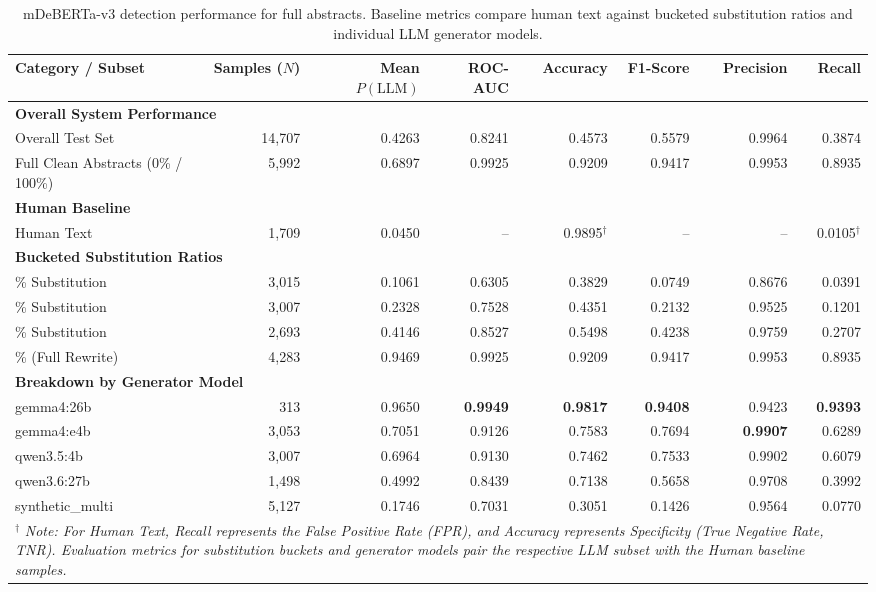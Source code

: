 \begin{table}[htbp]
\centering
\caption{mDeBERTa-v3 detection performance for full abstracts. Baseline metrics compare human text against bucketed substitution ratios and individual LLM generator models.}
\label{tab:mdeberta_abstract_performance}
\small
\begin{tabular}{l r r r r r r r}
\toprule
\textbf{Category / Subset} & \textbf{Samples ($N$)} & \textbf{Mean $P(\text{LLM})$} & \textbf{ROC-AUC} & \textbf{Accuracy} & \textbf{F1-Score} & \textbf{Precision} & \textbf{Recall} \\
\midrule
\multicolumn{8}{l}{\textbf{Overall System Performance}} \\
\quad Overall Test Set & 14,707 & 0.4263 & 0.8241 & 0.4573 & 0.5579 & 0.9964 & 0.3874 \\
\quad Full Clean Abstracts (0\% / 100\%) & 5,992 & 0.6897 & 0.9925 & 0.9209 & 0.9417 & 0.9953 & 0.8935 \\
\midrule
\multicolumn{8}{l}{\textbf{Human Baseline}} \\
\quad Human Text & 1,709 & 0.0450 & -- & 0.9895$^{\dagger}$ & -- & -- & 0.0105$^{\dagger}$ \\
\midrule
\multicolumn{8}{l}{\textbf{Bucketed Substitution Ratios}} \\
\quad 25\% Substitution & 3,015 & 0.1061 & 0.6305 & 0.3829 & 0.0749 & 0.8676 & 0.0391 \\
\quad 50\% Substitution & 3,007 & 0.2328 & 0.7528 & 0.4351 & 0.2132 & 0.9525 & 0.1201 \\
\quad 75\% Substitution & 2,693 & 0.4146 & 0.8527 & 0.5498 & 0.4238 & 0.9759 & 0.2707 \\
\quad 100\% (Full Rewrite) & 4,283 & 0.9469 & 0.9925 & 0.9209 & 0.9417 & 0.9953 & 0.8935 \\
\midrule
\multicolumn{8}{l}{\textbf{Breakdown by Generator Model}} \\
\quad gemma4:26b & 313 & 0.9650 & \textbf{0.9949} & \textbf{0.9817} & \textbf{0.9408} & 0.9423 & \textbf{0.9393} \\
\quad gemma4:e4b & 3,053 & 0.7051 & 0.9126 & 0.7583 & 0.7694 & \textbf{0.9907} & 0.6289 \\
\quad qwen3.5:4b & 3,007 & 0.6964 & 0.9130 & 0.7462 & 0.7533 & 0.9902 & 0.6079 \\
\quad qwen3.6:27b & 1,498 & 0.4992 & 0.8439 & 0.7138 & 0.5658 & 0.9708 & 0.3992 \\
\quad synthetic\_multi & 5,127 & 0.1746 & 0.7031 & 0.3051 & 0.1426 & 0.9564 & 0.0770 \\
\bottomrule
\multicolumn{8}{p{0.95\linewidth}}{\footnotesize 
$^{\dagger}$ \textit{Note: For Human Text, Recall represents the False Positive Rate (FPR), and Accuracy represents Specificity (True Negative Rate, TNR). Evaluation metrics for substitution buckets and generator models pair the respective LLM subset with the Human baseline samples.}
} \\
\end{tabular}
\end{table}